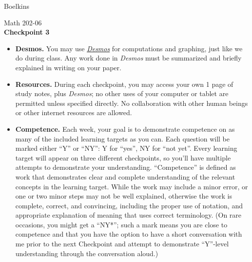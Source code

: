 \documentclass[11 pt]{article}
\begin{document}
 \hfill Boelkins \\
 
\begin{center}
Math 202-06 \\
{\bf Checkpoint 3}
\end{center}



\begin{itemize}
	
	\item {\bf Desmos.} You may use \href{https://www.desmos.com/calculator}{\emph{Desmos}} for computations and graphing, just like we do during class.  Any work done in \emph{Desmos} must be summarized and briefly explained in writing on your paper.  
	
	\item {\bf Resources.} During each checkpoint, you may access your own 1 page of study notes, plus \emph{Desmos}; no other uses of your computer or tablet are permitted unless specified directly.  No collaboration with other human beings or other internet resources are allowed.
	
	
	\item {\bf Competence.} Each week, your goal is to demonstrate competence on as many of the included learning targets as you can.  Each question will be marked either ``Y'' or ``NY'': Y for ``yes'', NY for ``not yet''.  Every learning target will appear on three different checkpoints, so you'll have multiple attempts to demonstrate your understanding.  ``Competence'' is defined as work that demonstrates clear and complete understanding of the relevant concepts in the learning target. While the work may include a minor error, or one or two minor steps may not be well explained, otherwise the work is complete, correct, and convincing, including the proper use of notation, and appropriate explanation of meaning that uses correct terminology.  (On rare occasions, you might get a ``NY*''; such a mark means you are close to competence and that you have the option to have a short conversation with me prior to the next Checkpoint and attempt to demonstrate ``Y''-level understanding through the conversation aloud.)	
\end{itemize}

\noindent \hrulefill \\
\end{document}
